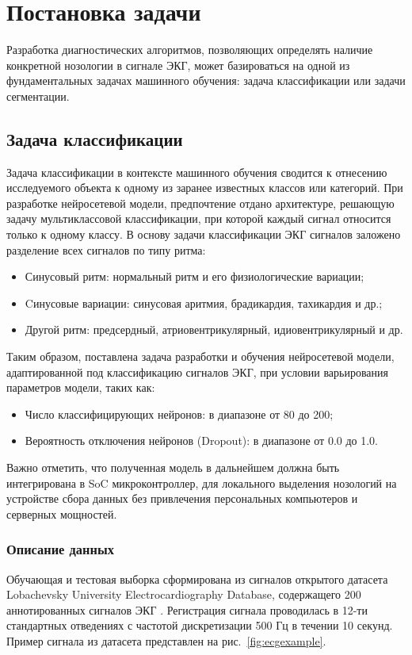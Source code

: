 \documentclass[11pt, oneside, a4paper]{article}
\begin{document}
\section{Постановка задачи}
\label{sec-problem}

Разработка диагностических алгоритмов, позволяющих определять наличие конкретной нозологии в сигнале ЭКГ, может базироваться на одной из фундаментальных задачах машинного обучения: задача классификации или задачи сегментации.

\subsection{Задача классификации}
Задача классификации в контексте машинного обучения сводится к отнесению исследуемого объекта к одному из заранее известных классов или категорий. 
При разработке нейросетевой модели, предпочтение отдано архитектуре, решающую задачу мультиклассовой классификации, при которой каждый сигнал относится только к одному классу.
В основу задачи классификации ЭКГ сигналов заложено разделение всех сигналов по типу ритма:
\begin{itemize}
  \item Синусовый ритм: нормальный ритм и его физиологические вариации;
  \item Cинусовые вариации: синусовая аритмия, брадикардия, тахикардия и др.;
  \item Другой ритм: предсердный, атриовентрикулярный, идиовентрикулярный и др.
\end{itemize}

Таким образом, поставлена задача разработки и обучения нейросетевой модели, адаптированной под классификацию сигналов ЭКГ, при условии варьирования параметров модели, таких как:
\begin{itemize}
  \item Число классифицирующих нейронов: в диапазоне от 80 до 200;
  \item Вероятность отключения нейронов (Dropout): в диапазоне от 0.0 до 1.0.
\end{itemize}
Важно отметить, что полученная модель в дальнейшем должна быть интегрирована в SoC микроконтроллер, для локального выделения нозологий на устройстве сбора данных без привлечения персональных компьютеров и серверных мощностей.

\subsubsection{Описание данных}
Обучающая и тестовая выборка сформирована из сигналов открытого датасета Lobachevsky University Electrocardiography Database, содержащего 200 аннотированных сигналов ЭКГ \cite{Kalyakulina2020}. Регистрация сигнала проводилась в 12-ти стандартных отведениях с частотой дискретизации 500 Гц в течении 10 секунд. Пример сигнала из датасета представлен на рис.~\ref{fig:ecgexample}.
\end{document}
